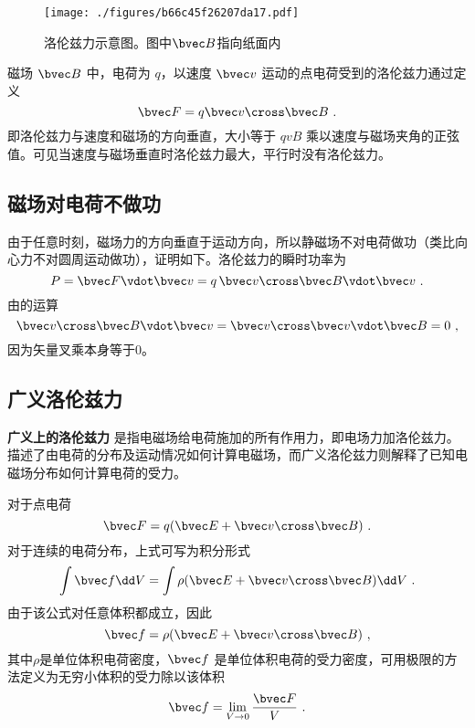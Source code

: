 
\begin{figure}[ht]
\centering
\texttt{[image: ./figures/b66c45f26207da17.pdf]}
\caption{洛伦兹力示意图。图中$\bvec B$指向纸面内} \label{fig_Lorenz_1}
\end{figure}
磁场 $\bvec B$ 中，电荷为 $q$，以速度 $\bvec v$ 运动的点电荷受到的洛伦兹力通过定义
\begin{equation}\label{eq_Lorenz_1}
\bvec F = q\bvec v \cross \bvec B~.
\end{equation}
即洛伦兹力与速度和磁场的方向垂直，大小等于 $qvB$ 乘以速度与磁场夹角的正弦值。可见当速度与磁场垂直时洛伦兹力最大，平行时没有洛伦兹力。

\subsection{磁场对电荷不做功}
由于任意时刻，磁场力的方向垂直于运动方向，所以静磁场不对电荷做功（类比向心力不对圆周运动做功），证明如下。洛伦兹力的瞬时功率为
\begin{equation}
P = \bvec F \vdot \bvec v = q\,\bvec v \cross \bvec B \vdot \bvec v~.
\end{equation}
由的运算
\begin{equation}
\bvec v \cross \bvec B \vdot \bvec v = \bvec v \cross \bvec v \vdot \bvec B = 0~,
\end{equation}
因为矢量叉乘本身等于0。


\subsection{广义洛伦兹力}
\textbf{广义上的洛伦兹力} 是指电磁场给电荷施加的所有作用力，即电场力加洛伦兹力。描述了由电荷的分布及运动情况如何计算电磁场，而广义洛伦兹力则解释了已知电磁场分布如何计算电荷的受力。

对于点电荷
\begin{equation}\label{eq_Lorenz_2}
\bvec F = q (\bvec E + \bvec v \cross \bvec B)~.
\end{equation}
对于连续的电荷分布，上式可写为积分形式
\begin{equation}
\int \bvec f \dd V= \int \rho(\bvec E + \bvec v \cross \bvec B) \dd V~.
\end{equation}
由于该公式对任意体积都成立，因此
\begin{equation}
\bvec f = \rho(\bvec E + \bvec v \cross \bvec B)~,
\end{equation}
其中$\rho$是单位体积电荷密度，$\bvec f$ 是单位体积电荷的受力密度，可用极限的方法定义为无穷小体积的受力除以该体积
\begin{equation}
\bvec f = \lim_{V \to 0} \frac{\bvec F}{V}~.
\end{equation}

